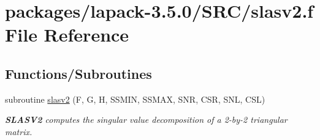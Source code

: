 \hypertarget{slasv2_8f}{}\section{packages/lapack-\/3.5.0/\+S\+R\+C/slasv2.f File Reference}
\label{slasv2_8f}
\subsection*{Functions/\+Subroutines}
\begin{DoxyCompactItemize}
\item 
subroutine \hyperlink{group__auxOTHERauxiliary_ga8783434fbc24d465134e5604c5737565}{slasv2} (F, G, H, S\+S\+M\+I\+N, S\+S\+M\+A\+X, S\+N\+R, C\+S\+R, S\+N\+L, C\+S\+L)
\begin{DoxyCompactList}\small\item\em {\bfseries S\+L\+A\+S\+V2} computes the singular value decomposition of a 2-\/by-\/2 triangular matrix. \end{DoxyCompactList}\end{DoxyCompactItemize}
